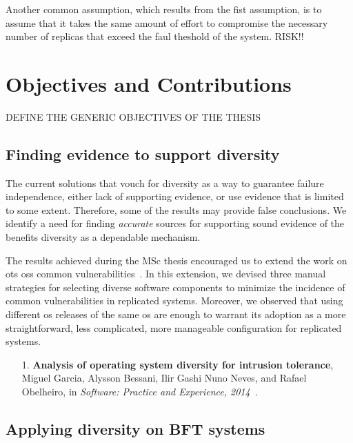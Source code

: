 Another common assumption, which results from the fist assumption, is to assume that it takes the same amount of effort to compromise the necessary number of replicas that exceed the faul theshold of the system.
RISK!!



\section{Objectives and Contributions}

DEFINE THE GENERIC OBJECTIVES OF THE THESIS 

\subsection{Finding evidence to support diversity}%
The current solutions that vouch for diversity as a way to guarantee failure independence, either lack of supporting evidence, or use evidence that is limited to some extent.
Therefore, some of the results may provide false conclusions.
We identify a need for finding \emph{accurate} sources for supporting sound evidence of the benefits diversity as a dependable mechanism.


The results achieved during the MSc thesis encouraged us to extend the work on \gls{ots} \glspl{os} common vulnerabilities~\cite{Garcia:2012}.
In this extension, we devised three manual strategies for selecting diverse software components to minimize the incidence of common vulnerabilities in replicated systems.
Moreover, we observed that using different \gls{os} releases of the same \gls{os} are enough to warrant its adoption as a more straightforward, less complicated, more manageable configuration for replicated systems.

\begin{enumerate}
\item[1.] \textbf{Analysis of operating system diversity for intrusion tolerance}, Miguel Garcia, Alysson Bessani, Ilir Gashi Nuno Neves, and Rafael Obelheiro, in \emph{Software: Practice and Experience, 2014}~\cite{Garcia:2014}.
\end{enumerate}



\subsection{Applying diversity on BFT systems}

